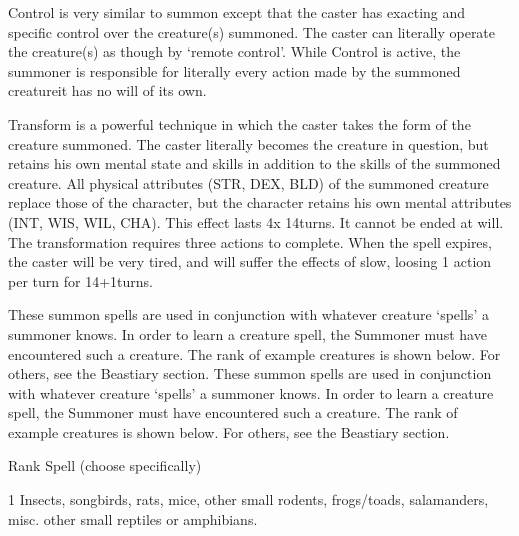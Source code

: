 \documentclass[twoside]{book}
\begin{document}
              
                  Control   is very similar to
                  summon except that the caster has exacting and specific
                  control over the creature(s) summoned. The caster can
                  literally operate the creature(s) as though by
                  `remote control'. While Control is active,
                  the summoner is responsible for literally every action
                  made by the summoned creatureit has no will of
                  its own.
                
              
                  Transform   is a powerful
                  technique in which the caster takes the form of the
                  creature summoned. The caster literally becomes the
                  creature in question, but retains his own mental state
                  and skills in addition to the skills of the summoned
                  creature. All physical attributes (STR, DEX, BLD) of
                  the summoned creature replace those of the character,
                  but the character retains his own mental attributes
                  (INT, WIS, WIL, CHA). This effect lasts 4x 14turns.
                  It cannot be ended at will. The transformation requires
                  three actions to complete. When the spell expires, the
                  caster will be very tired, and will suffer the effects
                  of slow, loosing 1 action per turn for 14+1turns.
                
              These summon spells are used in conjunction with
               whatever creature `spells' a summoner knows.
               In order to learn a creature spell, the Summoner must have
               encountered such a creature. The rank of example creatures
               is shown below. For others, see the Beastiary section.
                 These summon spells are used in conjunction with
               whatever creature `spells' a summoner knows.
               In order to learn a creature spell, the Summoner must have
               encountered such a creature. The rank of example creatures
               is shown below. For others, see the Beastiary section.
                 
                
                  
                   Rank   
                     Spell (choose specifically)
                     
                  
                  
                   1   
                     Insects, songbirds, rats, mice, other small
                     rodents, frogs/toads, salamanders, misc. other small
                     reptiles or amphibians. 
                  
\end{document}
